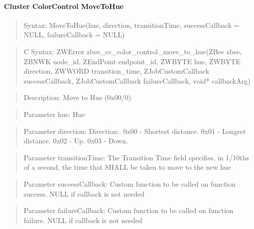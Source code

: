 \paragraph{Cluster ColorControl MoveToHue}
\begin{quote}Syntax: MoveToHue(hue, direction, transitionTime, successCallback = NULL, failureCallback = NULL)\end{quote}
\begin{quote}C Syntax: ZWError zbee\_cc\_color\_control\_move\_to\_hue(ZBee zbee, ZBNWK node\_id, ZEndPoint endpoint\_id, ZWBYTE hue, ZWBYTE direction, ZWWORD transition\_time, ZJobCustomCallback successCallback, ZJobCustomCallback failureCallback, void* callbackArg)\end{quote}
\begin{quote}Description: Move to Hue (0x00/0)\end{quote}
\begin{quote}Parameter hue: Hue\end{quote}
\begin{quote}Parameter direction: Direction:. 0x00 - Shortest distance. 0x01 - Longest distance. 0x02 - Up. 0x03 - Down. \end{quote}
\begin{quote}Parameter transitionTime: The Transition Time field specifies, in 1/10ths of a second, the time that SHALL be taken to move to the new hue\end{quote}
\begin{quote}Parameter successCallback: Custom function to be called on function success. NULL if callback is not needed\end{quote}
\begin{quote}Parameter failureCallback: Custom function to be called on function failure. NULL if callback is not needed\end{quote}


